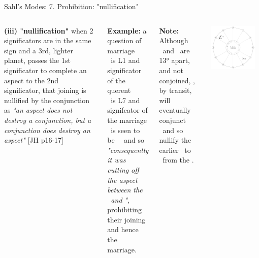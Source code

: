 \begin{frame}[t]{Sahl's Modes: 7. Prohibition: "nullification"}
\begin{columns}[T, onlytextwidth]
\small
{}
\vspace{0.5cm}
\textbf{(iii) "nullification"} when 2 significators are in the same sign and a 3rd, lighter planet, passes the 1st significator to complete an aspect to the 2nd significator, that joining is nullified by the conjunction as \textsl{"an aspect does not destroy a conjunction, but a conjunction does destroy an aspect"} [JH p16-17]

\vspace{0.25cm}
\textbf{Example:} a question of marriage \\
\ul
\Moon\ is L1 and significator of the querent \\
\Saturn\ is L7 and signifcator of the marriage \\
\Mars\ is seen to be \Conjunction\ \Saturn\ and so \textsl{"consequently it was cutting off the aspect between the \Moon\ and \Saturn"}, prohibiting their joining and hence the marriage.

\vspace{0.2cm}
\textbf{Note:} Although \Mars\ and \Saturn\ are 13° apart, and not conjoined, \Mars, by transit, will eventually conjunct \Saturn\ and so nullify the earlier \Opposition\ to \Saturn\ from the \Moon.

\begin{center}
{\includegraphics[width=0.9\textwidth]{charts/64-nullification}} \\
\end{center}
\end{columns}
\end{frame}
